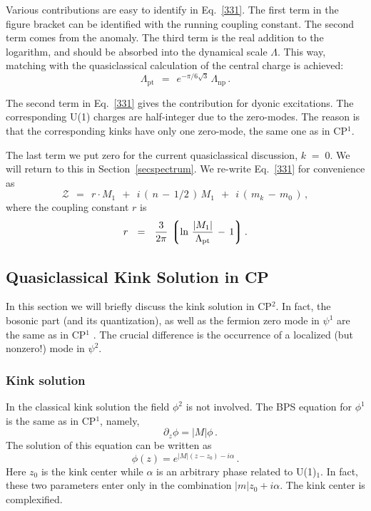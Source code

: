 \documentclass[epsfig,12pt]{article}
\def\beq{\begin{equation}}
\def\eeq{\end{equation}}
\def\beq{\begin{equation}}
\def\eeq{\end{equation}}
\newcommand{\mc}[1]{\mathcal{#1}}
\newcommand{\lgr}{\left\lgroup}
\newcommand{\rgr}{\right\rgroup}
\begin{document}
	Various contributions are easy to identify in Eq.~\eqref{331}.
	The first term in the figure bracket can be identified with the running coupling constant.
	The second term comes from the anomaly.
	The third term is the real addition to the logarithm, and should be absorbed into the dynamical scale $\Lambda$.
	This way, matching with the quasiclassical calculation of the central charge is achieved:
\beq
	\Lambda_\text{pt} ~~=~~ e^{- \pi / 6 \sqrt{3}}\, \Lambda_\text{np}\,.
\eeq

	The second term in Eq.~\eqref{331} gives the contribution for dyonic excitations.
	The corresponding U(1) charges are half-integer due to the zero-modes.
	The reason is that the corresponding kinks have only one zero-mode, the same one as in CP$^1$.

	The last term we put zero for the current quasiclassical discussion, $ k \;=\; 0 $.
	We will return to this in Section~\ref{secspectrum}.
	We re-write Eq.~\eqref{331} for convenience as 
\beq
\label{weak}
	\mc{Z}  ~~=~~  r \cdot M_1  ~~+~~  i\, (\,n \,-\, 1/2\,) \, M_1
	~~+~~ i\, (\, m_k \,-\, m_0 \,) \,,
\eeq
	where the coupling constant $ r $ is
\beq
	r  ~~=~~  \frac{3}{2\pi}\, \lgr \ln\, \frac {   |M_1|   }
                                               {  \Lambda_\text{pt}  } \,-\, 1 \rgr .
\eeq


\subsection[Quasiclassical Kink Solution in CP$^2$]
	{Quasiclassical Kink Solution in CP}
\label{kinksolu}

	In this section we will briefly discuss the kink solution in CP$^2$. 
	In fact, the bosonic part (and its quantization), 
	as well as the fermion zero mode in $\psi^1$ are the same as in CP$^1$ \cite{Shifman:2007ce}. 
	The crucial difference is the occurrence of a localized (but nonzero!) mode in $\psi^2$.


\subsubsection{Kink solution}

	In the classical kink solution the field $\phi^2$ is not involved. 
	The BPS equation for $\phi^1$ is the same as in CP$^1$, namely,
\beq
\quad \partial_z \phi = |M| \phi\,.
\label{13twentysix}
\eeq
	The solution of this equation  can be written as
\beq
\phi (z) = e^{|M|(z-z_0) -i\alpha}\,.
\label{13twentyseven}
\eeq
	Here $z_0$ is the kink center while $\alpha$ is an arbitrary phase related to U(1)$_1$.
	In fact, these two parameters enter only in the combination
	$|m| z_0 +i\alpha$. The kink center is complexified. 
\end{document}
